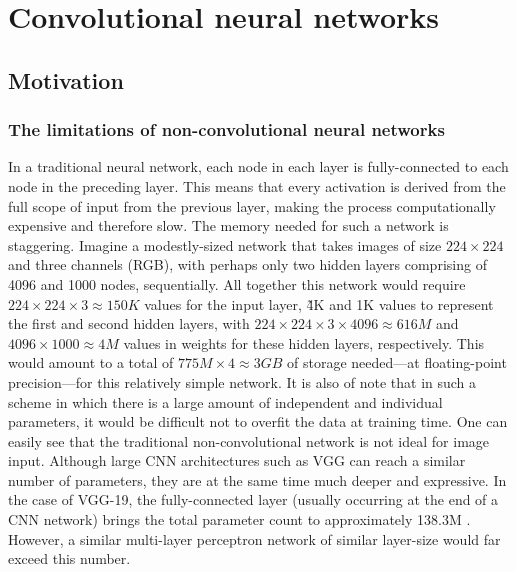 \section{Convolutional neural networks}
\subsection{Motivation}
\subsubsection{The limitations of non-convolutional neural networks}
In a traditional neural network, each node in each layer is fully-connected to each node in the preceding layer. This means that every activation is derived from the full scope of input from the previous layer, making the process computationally expensive and therefore slow. The memory needed for such a network is staggering. Imagine a modestly-sized network that takes images of size $224\times224$ and three channels (RGB), with perhaps only two hidden layers comprising of 4096 and 1000 nodes, sequentially. All together this network would require $224\times224\times3 \approx 150K$ values for the input layer, \~4K and 1K values to represent the first and second hidden layers, with $224\times224\times3\times4096 \approx 616M$ and $4096\times1000 \approx 4M$ values in weights for these hidden layers, respectively. This would amount to a total of $775M\times4 \approx 3 GB$ of storage needed---at floating-point precision---for this relatively simple network. It is also of note that in such a scheme in which there is a large amount of independent and individual parameters, it would be difficult not to overfit the data at training time. One can easily see that the traditional non-convolutional network is not ideal for image input. Although large CNN architectures such as VGG can reach a similar number of parameters, they are at the same time much deeper and expressive. In the case of VGG-19, the fully-connected layer (usually occurring at the end of a CNN network) brings the total parameter count to approximately 138.3M \cite{return}. However, a similar multi-layer perceptron network of similar layer-size would far exceed this number.


